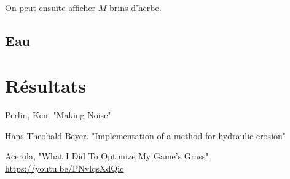 \documentclass[11pt]{article} %
\begin{document}
\paragraph{}
On peut ensuite afficher $M$ brins d'herbe.


\subsection{Eau}



\section{Résultats}




\begin{thebibliography}{9}
Perlin, Ken. "Making Noise"

Hans Theobald Beyer. "Implementation of a method for hydraulic erosion"

Acerola, "What I Did To Optimize My Game's Grass", \url{https://youtu.be/PNvlqsXdQic}
\end{thebibliography}

\listoffigures
\end{document}
